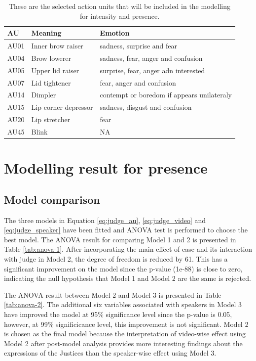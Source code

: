 \documentclass{monashthesis}
\begin{document}
\begin{table}[ht]
\begin{center}
\caption{\label{tab:au-included} These are the selected action units that will be included in the modelling for intensity and presence.}
\begin{tabular}{lll}
\toprule
AU & Meaning & Emotion \\
\midrule
AU01 & Inner brow raiser & sadness, surprise and fear \\
AU04 & Brow lowerer & sadness, fear, anger and confusion \\
AU05 & Upper lid raiser & surprise, fear, anger adn interested \\
AU07 & Lid tightener & fear, anger and confusion \\
AU14 & Dimpler & contempt or boredom if appears unilateraly \\
AU15 & Lip corner depressor & sadness, disgust and confusion \\
AU20 & Lip stretcher & fear \\
AU45 & Blink & NA \\
\bottomrule
\end{tabular}
\end{center}
\end{table}

\hypertarget{modelling-result-for-presence}{%
\section{Modelling result for presence}\label{modelling-result-for-presence}}

\hypertarget{model-comparison-1}{%
\subsection{Model comparison}\label{model-comparison-1}}

The three models in Equation \ref{eq:judge_au}, \ref{eq:judge_video} and \ref{eq:judge_speaker} have been fitted and ANOVA test is performed to choose the best model. The ANOVA result for comparing Model 1 and 2 is presented in Table \ref{tab:anova-1}. After incorporating the main effect of case and its interaction with judge in Model 2, the degree of freedom is reduced by 61. This has a significant improvement on the model since the p-value (1e-88) is close to zero, indicating the null hypothesis that Model 1 and Model 2 are the same is rejected.

The ANOVA result between Model 2 and Model 3 is presented in Table \ref{tab:anova-2}. The additional six variables associated with speakers in Model 3 have improved the model at 95\% significance level since the p-value is 0.05, however, at 99\% significicance level, this improvement is not significant. Model 2 is chosen as the final model because the interpretation of video-wise effect using Model 2 after post-model analysis provides more interesting findings about the expressions of the Justices than the speaker-wise effect using Model 3.
\end{document}
